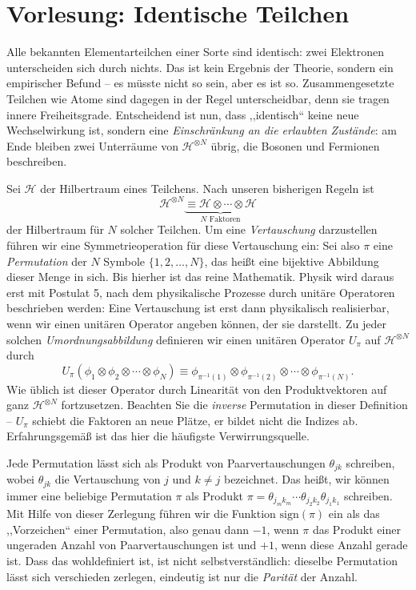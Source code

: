 
\section{Vorlesung: Identische Teilchen}
Alle bekannten Elementarteilchen einer Sorte sind identisch: zwei Elektronen unterscheiden sich durch nichts. Das ist kein Ergebnis der Theorie, sondern ein empirischer Befund -- es müsste nicht so sein, aber es ist so. Zusammengesetzte Teilchen wie Atome sind dagegen in der Regel unterscheidbar, denn sie tragen innere Freiheitsgrade. Entscheidend ist nun, dass ,,identisch`` keine neue Wechselwirkung ist, sondern eine \emph{Einschränkung an die erlaubten Zustände}: am Ende bleiben zwei Unterräume von $\mathcal{H}^{\otimes N}$ übrig, die Bosonen und Fermionen beschreiben.

Sei $\mathcal{H}$ der Hilbertraum eines Teilchens. Nach unseren bisherigen Regeln ist
\begin{equation}
  \mathcal{H}^{\otimes N} \underbrace{\equiv \mathcal{H}\otimes \cdots \otimes \mathcal{H}}_{\text{$N$ Faktoren}}
\end{equation}
der Hilbertraum für $N$ solcher Teilchen. Um eine \emph{Vertauschung} darzustellen führen wir eine Symmetrieoperation für diese Vertauschung ein: Sei also $\pi$ eine \emph{Permutation} der $N$ Symbole $\{1,2, \ldots,N\}$, das heißt eine bijektive Abbildung dieser Menge in sich. Bis hierher ist das reine Mathematik. Physik wird daraus erst mit Postulat 5, nach dem physikalische Prozesse durch unitäre Operatoren beschrieben werden: Eine Vertauschung ist erst dann physikalisch realisierbar, wenn wir einen unitären Operator angeben können, der sie darstellt. Zu jeder solchen \emph{Umordnungsabbildung} definieren
wir einen unitären Operator $U_\pi$ auf $\mathcal{H}^{\otimes N}$ durch
\begin{equation}
  U_\pi (\phi_1\otimes\phi_2\otimes \cdots\otimes \phi_N) \equiv \phi_{\pi^{-1}(1)}\otimes\phi_{\pi^{-1}(2)}\otimes \cdots\otimes \phi_{\pi^{-1}(N)}.
\end{equation}
Wie üblich ist dieser Operator durch Linearität von den Produktvektoren auf ganz $\mathcal{H}^{\otimes N}$ fortzusetzen. Beachten Sie die \emph{inverse} Permutation in dieser Definition -- $U_\pi$ schiebt die Faktoren an neue Plätze, er bildet nicht die Indizes ab. Erfahrungsgemäß ist das hier die häufigste Verwirrungsquelle.

Jede Permutation lässt sich als Produkt von Paarvertauschungen $\theta_{jk}$ schreiben, wobei $\theta_{jk}$
die Vertauschung von $j$ und $k\not=j$ bezeichnet. Das heißt, wir können immer eine beliebige Permutation $\pi$ als Produkt $\pi = \theta_{j_mk_m}\cdots\theta_{j_2k_2}\theta_{j_1k_1}$ schreiben. Mit Hilfe von dieser Zerlegung führen wir die Funktion $\text{sign}(\pi)$ ein als das ,,Vorzeichen`` einer Permutation, also genau
dann $-1$, wenn $\pi$ das Produkt einer ungeraden Anzahl von Paarvertauschungen ist und $+1$, wenn diese Anzahl gerade ist. Dass das wohldefiniert ist, ist nicht selbstverständlich: dieselbe Permutation lässt sich verschieden zerlegen, eindeutig ist nur die \emph{Parität} der Anzahl.

